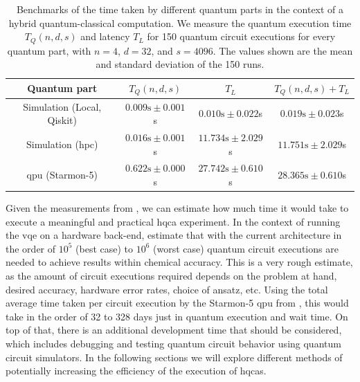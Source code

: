 \begin{table}[ht]
    \centering
    {\renewcommand{\arraystretch}{1.35}
        \begin{tabular}{ c|c|c|c }
            Quantum part & $T_Q(n, d, s)$ & $T_L$ & $T_Q(n, d, s) + T_L$ \\
            \hline
            Simulation (Local, Qiskit) & $0.009\text{s} \pm 0.001$s & $0.010 \text{s} \pm 0.022$s & $0.019 \text{s} \pm 0.023$s \\
            Simulation (\gls{hpc}) & $0.016\text{s} \pm 0.001$s & $11.734\text{s} \pm 2.029$s & $11.751\text{s} \pm 2.029$s \\
            \gls{qpu} (Starmon-5) & $0.622\text{s} \pm 0.000$s & $27.742\text{s} \pm 0.610$s & $28.365\text{s} \pm 0.610$s \\
        \end{tabular}
    }
    \caption[Benchmarks of the time taken by different quantum parts in the context of a hybrid quantum-classical computation.]{
        Benchmarks of the time taken by different quantum parts in the context of a hybrid quantum-classical computation.
        We measure the quantum execution time $T_Q(n, d, s)$ and latency $T_L$ for 150 quantum circuit executions for every quantum part, with $n = 4$, $d = 32$, and $s = 4096$.
        The values shown are the mean and standard deviation of the 150 runs.
    }
    \label{table:baseline-benchmark}
\end{table}

Given the measurements from , we can estimate how much time it would take to execute a meaningful and practical \gls{hqca} experiment.
In the context of running the \gls{vqe} on a hardware back-end, \textcite{kandala2017hardware} estimate that with the current architecture in the order of $10^5$ (best case) to $10^6$ (worst case) quantum circuit executions are needed to achieve results within chemical accuracy.
This is a very rough estimate, as the amount of circuit executions required depends on the problem at hand, desired accuracy, hardware error rates, choice of ansatz, etc.
Using the total average time taken per circuit execution by the Starmon-5 \gls{qpu} from , this would take in the order of 32 to 328 days just in quantum execution and wait time.
On top of that, there is an additional development time that should be considered, which includes debugging and testing quantum circuit behavior using quantum circuit simulators.
In the following sections we will explore different methods of potentially increasing the efficiency of the execution of \glspl{hqca}.


